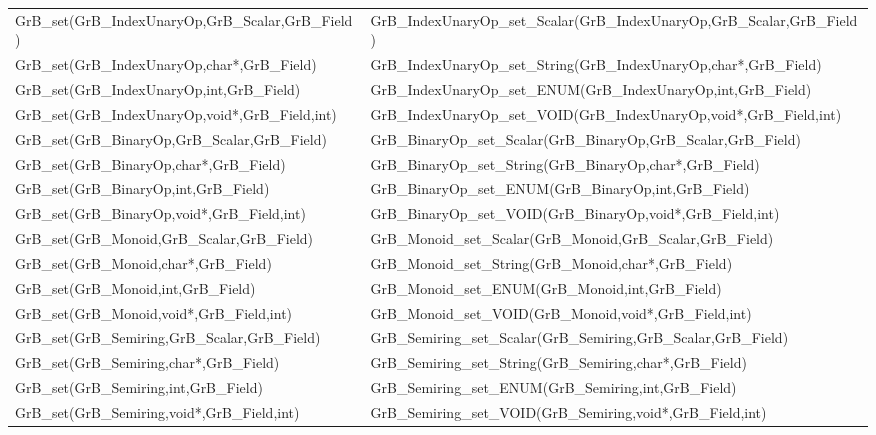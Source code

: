\begin{table}[htb]
{\begin{tabular}{l|l}
{\sf GrB\_set(GrB\_IndexUnaryOp,GrB\_Scalar,GrB\_Field)}  & {\sf GrB\_IndexUnaryOp\_set\_Scalar(GrB\_IndexUnaryOp,GrB\_Scalar,GrB\_Field)} \\
{\sf GrB\_set(GrB\_IndexUnaryOp,char*,GrB\_Field)}        & {\sf GrB\_IndexUnaryOp\_set\_String(GrB\_IndexUnaryOp,char*,GrB\_Field)}       \\
{\sf GrB\_set(GrB\_IndexUnaryOp,int,GrB\_Field)}            & {\sf GrB\_IndexUnaryOp\_set\_ENUM(GrB\_IndexUnaryOp,int,GrB\_Field)}         \\
{\sf GrB\_set(GrB\_IndexUnaryOp,void*,GrB\_Field,int)}      & {\sf GrB\_IndexUnaryOp\_set\_VOID(GrB\_IndexUnaryOp,void*,GrB\_Field,int)}   \\
\hline

{\sf GrB\_set(GrB\_BinaryOp,GrB\_Scalar,GrB\_Field)}  & {\sf GrB\_BinaryOp\_set\_Scalar(GrB\_BinaryOp,GrB\_Scalar,GrB\_Field)} \\
{\sf GrB\_set(GrB\_BinaryOp,char*,GrB\_Field)}        & {\sf GrB\_BinaryOp\_set\_String(GrB\_BinaryOp,char*,GrB\_Field)}       \\
{\sf GrB\_set(GrB\_BinaryOp,int,GrB\_Field)}            & {\sf GrB\_BinaryOp\_set\_ENUM(GrB\_BinaryOp,int,GrB\_Field)}         \\
{\sf GrB\_set(GrB\_BinaryOp,void*,GrB\_Field,int)}      & {\sf GrB\_BinaryOp\_set\_VOID(GrB\_BinaryOp,void*,GrB\_Field,int)}   \\
\hline

{\sf GrB\_set(GrB\_Monoid,GrB\_Scalar,GrB\_Field)}  & {\sf GrB\_Monoid\_set\_Scalar(GrB\_Monoid,GrB\_Scalar,GrB\_Field)} \\
{\sf GrB\_set(GrB\_Monoid,char*,GrB\_Field)}        & {\sf GrB\_Monoid\_set\_String(GrB\_Monoid,char*,GrB\_Field)}       \\
{\sf GrB\_set(GrB\_Monoid,int,GrB\_Field)}            & {\sf GrB\_Monoid\_set\_ENUM(GrB\_Monoid,int,GrB\_Field)}         \\
{\sf GrB\_set(GrB\_Monoid,void*,GrB\_Field,int)}      & {\sf GrB\_Monoid\_set\_VOID(GrB\_Monoid,void*,GrB\_Field,int)}   \\
\hline

{\sf GrB\_set(GrB\_Semiring,GrB\_Scalar,GrB\_Field)}  & {\sf GrB\_Semiring\_set\_Scalar(GrB\_Semiring,GrB\_Scalar,GrB\_Field)} \\
{\sf GrB\_set(GrB\_Semiring,char*,GrB\_Field)}        & {\sf GrB\_Semiring\_set\_String(GrB\_Semiring,char*,GrB\_Field)}       \\
{\sf GrB\_set(GrB\_Semiring,int,GrB\_Field)}            & {\sf GrB\_Semiring\_set\_ENUM(GrB\_Semiring,int,GrB\_Field)}         \\
{\sf GrB\_set(GrB\_Semiring,void*,GrB\_Field,int)}      & {\sf GrB\_Semiring\_set\_VOID(GrB\_Semiring,void*,GrB\_Field,int)}   \\
\hline


\end{tabular}}
\end{table}
